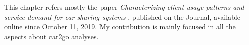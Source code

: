 
%

This chapter refers mostly the paper \textit{Characterizing client usage patterns and service demand for car-sharing systems} \cite{VancouverCS}, published on the Journal, available online since October 11, 2019. My contribution is mainly focused in all the aspects about car2go analyses. 


